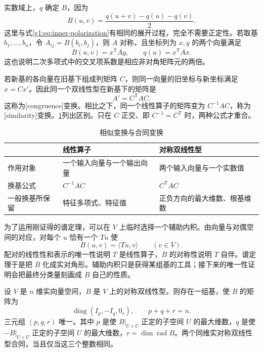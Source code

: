 实数域上，\(q\) 确定 \(B\)，因为
\[
	B(u,v)=\frac{q(u+v)-q(u)-q(v)}2.
\]
这里与式\eqref{g1:eq:inner-polarization}有相同的展开过程，完全不需要正定性。若取基 \(b_1,\ldots,b_n\)，令 \(A_{ij}=B(b_i,b_j)\)，则 \(A\) 对称，且坐标列为 \(x,y\) 的两个向量满足
\[
	B(u,v)=x^{\mathsf T}Ay,\qquad q(u)=x^{\mathsf T}Ax.
\]
这也说明二次多项式中的交叉项系数是相应非对角矩阵元的两倍。

\ProseParagraphBreak

若新基的各向量在旧基下组成列矩阵 \(C\)，则同一向量的旧坐标与新坐标满足 \(x=Cx'\)。因此同一个双线性型在新基下的矩阵是
\[
	A'=C^{\mathsf T}AC.
\]
这称为[congruence]变换。相比之下，同一个线性算子的矩阵变为 \(C^{-1}AC\)，称为[similarity]变换。\cref{g1:tab:similarity-congruence}列出区别。只在 \(C\) 正交、即 \(C^{-1}=C^{\mathsf T}\) 时，两种公式才重合。

\begin{table}[htbp]
	\centering
	\caption{相似变换与合同变换}
	\label{g1:tab:similarity-congruence}
	\begin{tabularx}{\linewidth}{@{}lXX@{}}
		\toprule
		& 线性算子 & 对称双线性型 \\
		\midrule
		作用对象 & 一个输入向量与一个输出向量 & 两个输入向量与一个实数值 \\
		换基公式 & \(C^{-1}AC\) & \(C^{\mathsf T}AC\) \\
		一般换基所保留 & 特征多项式、特征值 & 正负方向的最大维数、根基维数 \\
		\bottomrule
	\end{tabularx}
\end{table}

为了运用刚证得的谱定理，可以在 \(V\) 上临时选择一个辅助内积。由向量与对偶空间的对应，对每个 \(u\) 恰有一个 \(Tu\) 使
\[
	B(u,v)=\langle Tu,v\rangle\qquad(v\in V).
\]
配对的线性性和表示的唯一性说明 \(T\) 是线性算子，\(B\) 的对称性说明 \(T\) 自伴。谱定理于是把 \(B\) 化成实对角形。辅助内积只是获得某组基的工具；接下来的唯一性证明会把最终分类量刻画成 \(B\) 自己的性质。

\begin{theorem}[实对称双线性型的惯性定理]
	\label{g1:thm:inertia}
	设 \(V\) 是 \(n\) 维实向量空间，\(B\) 是 \(V\) 上的对称双线性型。则存在一组基，使 \(B\) 的矩阵为
	\[
		\operatorname{diag}(I_p,-I_q,0_r),\qquad p+q+r=n.
	\]
	三元组 \((p,q,r)\) 唯一。其中 \(p\) 是使 \(B|_{U\times U}\) 正定的子空间 \(U\) 的最大维数，\(q\) 是使 \(-B|_{U\times U}\) 正定的子空间 \(U\) 的最大维数，\(r=\dim\operatorname{rad}B\)。两个同维实对称双线性型合同，当且仅当这三个整数相同。
\end{theorem}

